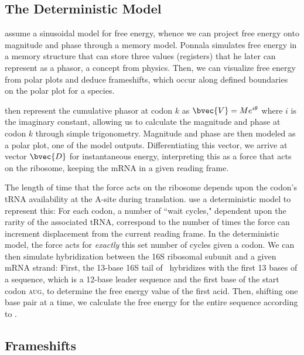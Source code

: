 \documentclass[12pt, draft]{article}
\numberwithin{equation}{section}
\begin{document}
\subsection{The Deterministic Model}
\citet{lalit:mechanics} assume a sinusoidal model for
free energy, whence we can project free energy onto magnitude and
phase through a memory model. Ponnala simulates free
energy in a memory structure that can store three values (registers)
that he later can represent as a phasor, a concept from physics. Then,
we can visualize free energy from polar plots and deduce frameshifts,
which occur along defined boundaries~\citet{lalit:mechanics} on the polar plot for a species.
 
\citet{lalit:embs} then represent the cumulative phasor
at codon $k$ as $\bvec{V} = Me^{i\theta}$ where $i$ is the imaginary
constant, allowing us to calculate the magnitude and phase at codon
$k$ through simple trigonometry. Magnitude and phase are then modeled
as a polar plot, one of the model outputs. Differentiating this vector, we
arrive at vector $\bvec{D}$ for instantaneous energy, interpreting
this as a force that acts on the ribosome, keeping the mRNA in
a given reading frame.
 
The length of time that the force acts on the ribosome depends upon
the codon's tRNA availability at the A-site during translation.
\citeauthor{lalit:mechanics} use a deterministic model to represent this: For each codon,
a number of ``wait cycles," dependent upon the rarity of the
associated tRNA, correspond to the number of times the force can
increment displacement from the current reading frame.  In the
deterministic model, the force acts for \emph{exactly} this set number
of cycles given a codon. We can then simulate hybridization between the
16S ribosomal subunit and a given mRNA strand: First, the 13-base 16S
tail of \ecoli\ hybridizes with the first 13 bases of a sequence,
which is a 12-base leader sequence and the first base of the start
codon \textsc{aug}, to determine the free energy value of the first acid.
Then, shifting one base pair at a time, we calculate the free energy
for the entire sequence according to \citet{starmer}.

\subsection{Frameshifts}
\label{section:frameshifts}
\end{document}
